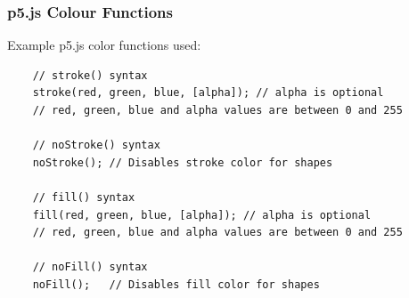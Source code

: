 \documentclass{article}
\begin{document}
\subsubsection*{p5.js Colour Functions}

\noindent Example p5.js color functions used:
    
\begin{verbatim}
    // stroke() syntax
    stroke(red, green, blue, [alpha]); // alpha is optional
    // red, green, blue and alpha values are between 0 and 255

    // noStroke() syntax
    noStroke(); // Disables stroke color for shapes

    // fill() syntax
    fill(red, green, blue, [alpha]); // alpha is optional
    // red, green, blue and alpha values are between 0 and 255

    // noFill() syntax
    noFill();   // Disables fill color for shapes


\end{verbatim}
\end{document}
